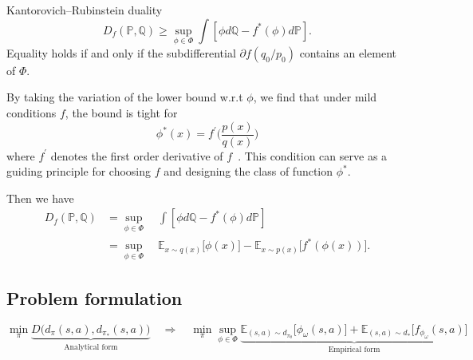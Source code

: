 \begin{lemma}
\citep{villani2008optimal} Kantorovich–Rubinstein duality
\begin{equation*}
D_{f} (\mathbb{P}, \mathbb{Q}) \geq \sup_{\phi\in \Phi} \int [\phi d\mathbb{Q} - f^*(\phi) d\mathbb{P} ] . 
\end{equation*}
Equality holds if and only if the subdifferential $\partial f(q_0/p_0)$ contains an element of $\Phi$. 
\end{lemma}

By taking the variation of the lower bound w.r.t $\phi$, we find that under mild conditions $f$, the bound is tight for 
\begin{equation*}
\phi^*(x) = f^\prime \Big( \frac{p(x)}{q(x)} \Big)
\end{equation*}
where $f^\prime$ denotes the first order derivative of $f$~\citep{nowozin2016f}. This condition can serve as a guiding principle for choosing $f$ and designing the class of function $\phi^*$. 

Then we have 
\begin{align*}
D_f (\mathbb{P}, \mathbb{Q}) &= \sup_{\phi\in \Phi} \quad \int [\phi d\mathbb{Q} - f^*(\phi)d\mathbb{P}] \\
&= \sup_{\phi\in\Phi} \quad \mathbb{E}_{x\sim q(x)} \big[ \phi(x) \big] - \mathbb{E}_{x\sim p(x)} \big[ f^*(\phi(x)) \big].
\end{align*}

\subsection{Problem formulation}
\begin{equation*}
\min_{\pi} \underbrace{D\big(d_{\pi}(s, a), d_{\pi_*}(s, a)\big)}_{\text{Analytical form}} \quad \Rightarrow \quad \min_{\pi} \sup_{\phi\in\Phi} \underbrace{ \mathbb{E}_{(s, a)\sim d_{\pi_{\theta}}} \big[ \phi_{\omega}(s, a) \big] + \mathbb{E}_{(s, a)\sim d_*} \big[ f_{\phi_{\omega}}(s, a) \big]}_{\text{Empirical form}}
\end{equation*}


